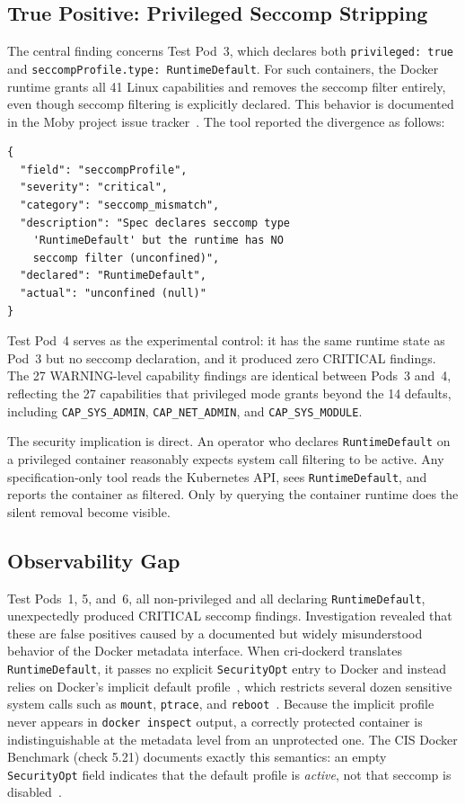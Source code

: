 \documentclass[sigconf]{acmart}
\begin{document}
\subsection{True Positive: Privileged Seccomp Stripping}

The central finding concerns Test Pod~3, which declares both \texttt{privileged: true} and \texttt{seccompProfile.type: RuntimeDefault}. For such containers, the Docker runtime grants all 41 Linux capabilities and removes the seccomp filter entirely, even though seccomp filtering is explicitly declared. This behavior is documented in the Moby project issue tracker~\cite{moby41321}. The tool reported the divergence as follows:

\begin{lstlisting}
{
  "field": "seccompProfile",
  "severity": "critical",
  "category": "seccomp_mismatch",
  "description": "Spec declares seccomp type
    'RuntimeDefault' but the runtime has NO
    seccomp filter (unconfined)",
  "declared": "RuntimeDefault",
  "actual": "unconfined (null)"
}
\end{lstlisting}

Test Pod~4 serves as the experimental control: it has the same runtime state as Pod~3 but no seccomp declaration, and it produced zero CRITICAL findings. The 27 WARNING-level capability findings are identical between Pods~3 and~4, reflecting the 27 capabilities that privileged mode grants beyond the 14 defaults, including \texttt{CAP\_SYS\_ADMIN}, \texttt{CAP\_NET\_ADMIN}, and \texttt{CAP\_SYS\_MODULE}.

The security implication is direct. An operator who declares \texttt{RuntimeDefault} on a privileged container reasonably expects system call filtering to be active. Any specification-only tool reads the Kubernetes API, sees \texttt{RuntimeDefault}, and reports the container as filtered. Only by querying the container runtime does the silent removal become visible.

\subsection{Observability Gap}
\label{sec:obsgap}

Test Pods~1, 5, and~6, all non-privileged and all declaring \texttt{RuntimeDefault}, unexpectedly produced CRITICAL seccomp findings. Investigation revealed that these are false positives caused by a documented but widely misunderstood behavior of the Docker metadata interface. When cri-dockerd translates \texttt{RuntimeDefault}, it passes no explicit \texttt{SecurityOpt} entry to Docker and instead relies on Docker's implicit default profile~\cite{dockerseccomp2024}, which restricts several dozen sensitive system calls such as \texttt{mount}, \texttt{ptrace}, and \texttt{reboot}~\cite{datadog2023}. Because the implicit profile never appears in \texttt{docker inspect} output, a correctly protected container is indistinguishable at the metadata level from an unprotected one. The CIS Docker Benchmark (check 5.21) documents exactly this semantics: an empty \texttt{SecurityOpt} field indicates that the default profile is \emph{active}, not that seccomp is disabled~\cite{cisdocker2024, moric2025}.
\end{document}
